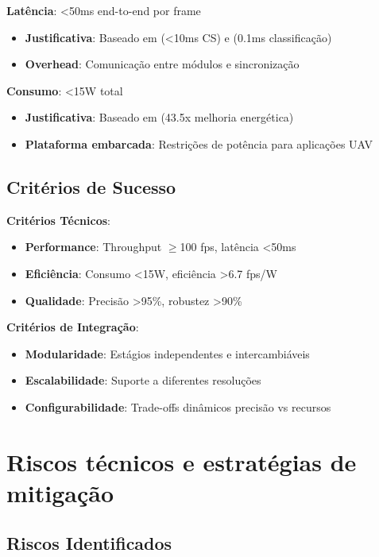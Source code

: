 \textbf{Latência}: <50ms end-to-end por frame
\begin{itemize}
    \item \textbf{Justificativa}: Baseado em \textcite{Lim2022} (<10ms CS) e \textcite{Martins2019} (0.1ms classificação)
    \item \textbf{Overhead}: Comunicação entre módulos e sincronização
\end{itemize}

\textbf{Consumo}: <15W total
\begin{itemize}
    \item \textbf{Justificativa}: Baseado em \textcite{Hwang2011} (43.5x melhoria energética)
    \item \textbf{Plataforma embarcada}: Restrições de potência para aplicações UAV
\end{itemize}

\subsection{Critérios de Sucesso}\label{subsec:criterios_sucesso}

\textbf{Critérios Técnicos}:
\begin{itemize}
    \item \textbf{Performance}: Throughput $\geq$100 fps, latência <50ms
    \item \textbf{Eficiência}: Consumo <15W, eficiência >6.7 fps/W
    \item \textbf{Qualidade}: Precisão >95\%, robustez >90\%
\end{itemize}

\textbf{Critérios de Integração}:
\begin{itemize}
    \item \textbf{Modularidade}: Estágios independentes e intercambiáveis
    \item \textbf{Escalabilidade}: Suporte a diferentes resoluções
    \item \textbf{Configurabilidade}: Trade-offs dinâmicos precisão vs recursos
\end{itemize}

\section{Riscos técnicos e estratégias de mitigação}\label{sec:riscos_estrategias}

\subsection{Riscos Identificados}\label{subsec:riscos_identificados}


